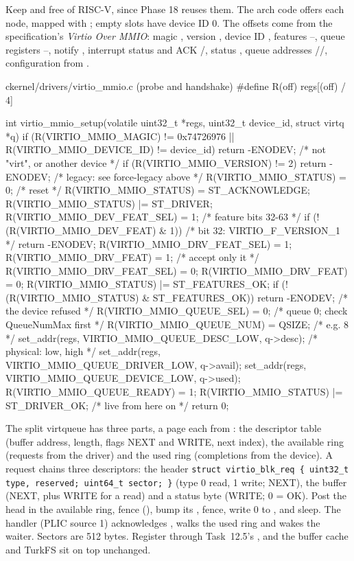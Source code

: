 \documentclass[11pt,a4paper]{article}
\begin{document}
Keep  and  free of RISC-V, since Phase 18 reuses them. The arch code offers
each  node, mapped with ; empty slots have device ID 0. The  offsets
come from the specification's \emph{Virtio Over MMIO}: magic , version , device ID
, features --, queue registers --, notify ,
interrupt status and ACK /, status , queue addresses //,
configuration from .

\begin{lst}{c}{kernel/drivers/virtio_mmio.c (probe and handshake)}
#define R(off) regs[(off) / 4]

int virtio_mmio_setup(volatile uint32_t *regs, uint32_t device_id, struct virtq *q)
{
    if (R(VIRTIO_MMIO_MAGIC) != 0x74726976 || R(VIRTIO_MMIO_DEVICE_ID) != device_id)
        return -ENODEV;                           /* not "virt", or another device */
    if (R(VIRTIO_MMIO_VERSION) != 2)
        return -ENODEV;                           /* legacy: see force-legacy above */
    R(VIRTIO_MMIO_STATUS) = 0;                    /* reset */
    R(VIRTIO_MMIO_STATUS) = ST_ACKNOWLEDGE;
    R(VIRTIO_MMIO_STATUS) |= ST_DRIVER;
    R(VIRTIO_MMIO_DEV_FEAT_SEL) = 1;              /* feature bits 32-63 */
    if (!(R(VIRTIO_MMIO_DEV_FEAT) & 1))           /* bit 32: VIRTIO_F_VERSION_1 */
        return -ENODEV;
    R(VIRTIO_MMIO_DRV_FEAT_SEL) = 1;  R(VIRTIO_MMIO_DRV_FEAT) = 1;   /* accept only it */
    R(VIRTIO_MMIO_DRV_FEAT_SEL) = 0;  R(VIRTIO_MMIO_DRV_FEAT) = 0;
    R(VIRTIO_MMIO_STATUS) |= ST_FEATURES_OK;
    if (!(R(VIRTIO_MMIO_STATUS) & ST_FEATURES_OK))
        return -ENODEV;                           /* the device refused */
    R(VIRTIO_MMIO_QUEUE_SEL) = 0;                 /* queue 0; check QueueNumMax first */
    R(VIRTIO_MMIO_QUEUE_NUM) = QSIZE;             /* e.g. 8 */
    set_addr(regs, VIRTIO_MMIO_QUEUE_DESC_LOW, q->desc);     /* physical: low, high */
    set_addr(regs, VIRTIO_MMIO_QUEUE_DRIVER_LOW, q->avail);
    set_addr(regs, VIRTIO_MMIO_QUEUE_DEVICE_LOW, q->used);
    R(VIRTIO_MMIO_QUEUE_READY) = 1;
    R(VIRTIO_MMIO_STATUS) |= ST_DRIVER_OK;        /* live from here on */
    return 0;
}
\end{lst}

The split virtqueue has three parts, a page each from : the descriptor table (buffer address,
length, flags NEXT and WRITE, next index), the available ring (requests from the driver) and the used ring (completions
from the device). A request chains three descriptors: the header \texttt{struct virtio\_blk\_req \{ uint32\_t type,
reserved; uint64\_t sector; \}} (type 0 read, 1 write; NEXT), the buffer (NEXT, plus WRITE for a read) and a status
byte (WRITE; 0 = OK). Post the head in the available ring, fence (), bump its ,
fence, write 0 to , and sleep. The handler (PLIC source 1) acknowledges , walks
the used ring and wakes the waiter. Sectors are 512 bytes. Register  through Task~12.5's
, and the buffer cache and TurkFS sit on top unchanged.
\end{document}
